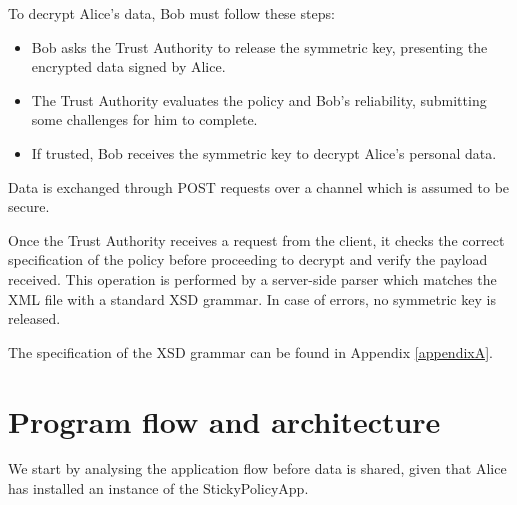 To decrypt Alice's data, Bob must follow these steps:
\begin{itemize}
	\item Bob asks the Trust Authority to release the symmetric key, presenting the encrypted data signed by Alice.
	\item The Trust Authority evaluates the policy and Bob's reliability, submitting some challenges for him to complete.
	\item If trusted, Bob receives the symmetric key to decrypt Alice's personal data.
\end{itemize}

Data is exchanged through POST requests over a channel which is assumed to be secure.

Once the Trust Authority receives a request from the client, it checks the correct specification of the policy before proceeding to decrypt and verify the payload received. This operation is performed by a server-side parser which matches the XML file with a standard XSD grammar. In case of errors, no symmetric key is released.

The specification of the XSD grammar can be found in Appendix \ref{appendixA}. 

\section{Program flow and architecture}
We start by analysing the application flow before data is shared, given that Alice has installed an instance of the StickyPolicyApp.

